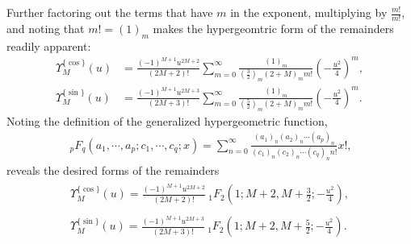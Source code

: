 Further factoring out the terms that have $m$ in the exponent, multiplying by $\frac{m!}{m!}$, and noting that $m! = (1)_m$ makes the hypergeomtric form of the remainders readily apparent:
\begin{align}
	\Upsilon_M^{\{\cos\}}(u) &= 
	\frac{(-1)^{M+1}u^{2M+2}}{(2M+2)!}
	\sum_{m=0}^{\infty}
	\frac{(1)_m}{\left(\frac{3}{2}\right)_m(2+M)_m m!} \left(-\frac{u^2}{4}\right)^m, \\
	\Upsilon_M^{\{\sin\}}(u) &= 
	\frac{(-1)^{M+1}u^{2M+3}}{(2M+3)!}
	\sum_{m=0}^{\infty}
	\frac{(1)_m}{\left(\frac{5}{2}\right)_m(2+M)_m m!}\left(-\frac{u^2}{4}\right)^m.
\end{align}
Noting the definition of the generalized hypergeometric function,
\begin{align}
	\ {}_{p}F_{q}
	\left(a_1, \cdots, a_p; c_1, \cdots, c_q; x\right) = 
	\sum_{n=0}^{\infty}
	\frac{(a_1)_n (a_2)_n \cdots (a_p)_n}{(c_1)_n (c_2)_n \cdots (c_q)_n n!} x!, 
\end{align}
reveals the desired forms of the remainders
\begin{align}
	\begin{split}
		\Upsilon_M^{\{\cos\}}(u) = 
		\frac{(-1)^{M+1} u^{2M+2}}{(2M + 2)!}
		\ {}_{1}F_{2}
		\left(1; M+2, M+\frac{3}{2}; -\frac{u^2}{4}\right), 
	\end{split}
	\\
	\begin{split}
		\Upsilon_M^{\{\sin\}}(u) = 
		\frac{(-1)^{M+1} u^{2M+3}}{(2M+3)!}
		\ {}_{1}F_{2}
		\left(1; M+2, M+\frac{5}{2}; -\frac{u^2}{4}\right).
	\end{split}
\end{align}



